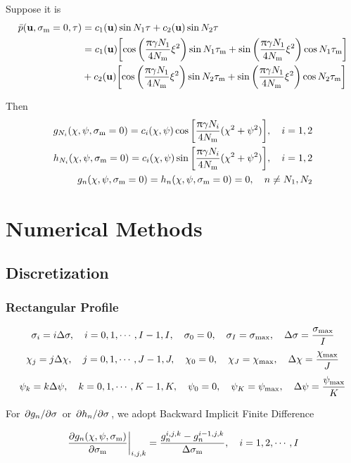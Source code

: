 \documentclass{article}
\begin{document}
Suppose it is 
\begin{align}
	\bar{p} (\vb{u},\sigma_\text{m} =0, \tau) &= c_1(\vb{u}) \sin N_1 \tau
	+c_2(\vb{u}) \sin N_2\tau \\
	& = c_1(\vb{u}) \qty[\cos\qty(\frac{\uppi \gamma N_1}{4N_\text{m}} \xi^2)\sin N_1 \tau_\text{m}
	+ \sin \qty(\frac{\uppi \gamma N_1}{4N_\text{m}}\xi^2)\cos N_1 \tau_\text{m}] \nonumber \\
	&+ c_2(\vb{u}) \qty[\cos\qty(\frac{\uppi \gamma N_1}{4N_\text{m}} \xi^2)\sin N_2\tau_\text{m}
	+ \sin \qty(\frac{\uppi \gamma N_1}{4 N_\text{m}}\xi^2)\cos N_2\tau_\text{m}]
\end{align}

Then
\begin{align}
	g_{N_i} (\chi, \psi, \sigma\st{m}=0) = c_i(\chi,\psi) \cos 
	\qty[\frac{\uppi \gamma N_i}{4 N\st{m}} (\chi^2 +\psi^2)]\qc i = 1,2\\
	h_{N_i} (\chi, \psi, \sigma\st{m}=0) = c_i(\chi,\psi) \sin 
	\qty[\frac{\uppi \gamma N_i}{4 N\st{m}} (\chi^2 +\psi^2)]\qc i=1,2\\
	g_n(\chi,\psi, \sigma\st{m}=0) = h_n(\chi,\psi,\sigma\st{m}=0) = 0\qc 
	n \neq N_1, N_2
\end{align}

\section{Numerical Methods}

\subsection{Discretization}
\subsubsection{Rectangular Profile}
$$
\sigma_i = i\Delta \sigma\qc i=0,1, \cdots, I-1, I\qc \sigma_0 = 0\qc \sigma_I = \sigma_\text{max}\qc \Delta\sigma = \frac{\sigma\st{max}}{I}
$$
$$
\chi_j = j\Delta \chi\qc j=0,1, \cdots, J-1, J\qc \chi_0 = 0\qc \chi_J = 
\chi_\text{max}\qc \Delta\chi = \frac{\chi\st{max}}{J}
$$
$$
\psi_k = k\Delta \psi\qc k=0,1, \cdots, K-1, K\qc \psi_0 = 0\qc \psi_K = \psi_\text{max}\qc \Delta\psi = \frac{\psi\st{max}}{K}
$$


For $\pdv*{g_n}{\sigma}$ or $\pdv*{h_n}{\sigma}$, we adopt Backward Implicit
Finite Difference

\begin{align}
	\left. \pdv{g_n(\chi,\psi,\sigma\st{m})}{\sigma\st{m}}\right|_{i,j,k} 
	= \frac{g_n^{i,j,k} - g_n^{i-1,j,k}}{\Delta \sigma\st{m}}\qc
	i = 1,2, \cdots, I
\end{align}
\end{document}
